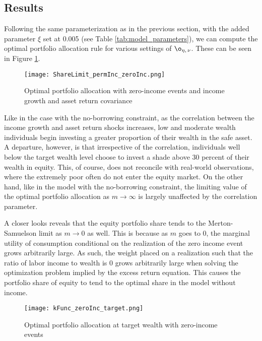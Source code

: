 \subsection{Results}

Following the same parameterization as in the previous section, with the added parameter $\xi$ set at 0.005 (see Table \ref{tab:model_parameters}), we can compute the optimal portfolio allocation rule for various settings of $\o_{\eta,\,\nu}$. These can be seen in Figure \ref{fig:zeroInc_shareLimit}.

\begin{figure}[h]
    \centering
    \texttt{[image: ShareLimit\_permInc\_zeroInc.png]}
    \caption{Optimal portfolio allocation with zero-income events and income growth and asset return covariance}
    \label{fig:zeroInc_shareLimit}
\end{figure}

Like in the case with the no-borrowing constraint, as the correlation between the income growth and asset return shocks increases, low and moderate wealth individuals begin investing a greater proportion of their wealth in the safe asset. A departure, however, is that irrespective of the correlation, individuals well below the target wealth level choose to invest a shade above 30 percent of their wealth in equity. This, of course, does not reconcile with real-world observations, where the extremely poor often do not enter the equity market. On the other hand, like in the model with the no-borrowing constraint, the limiting value of the optimal portfolio allocation as $m \to \infty$ is largely unaffected by the correlation parameter.

A closer looks reveals that the equity portfolio share tends to the Merton-Samuelson limit as $m \to 0$ as well. This is because as $m$ goes to 0, the marginal utility of consumption conditional on the realization of the zero income event grows arbitrarily large. As such, the weight placed on a realization such that the ratio of labor income to wealth is 0 grows arbitrarily large when solving the optimization problem implied by the excess return equation. This causes the portfolio share of equity to tend to the optimal share in the model without income.

\begin{figure}[h]
    \centering
    \texttt{[image: kFunc\_zeroInc\_target.png]}
    \caption{Optimal portfolio allocation at target wealth with zero-income events}
    \label{fig:zeroInc_target}
\end{figure}

